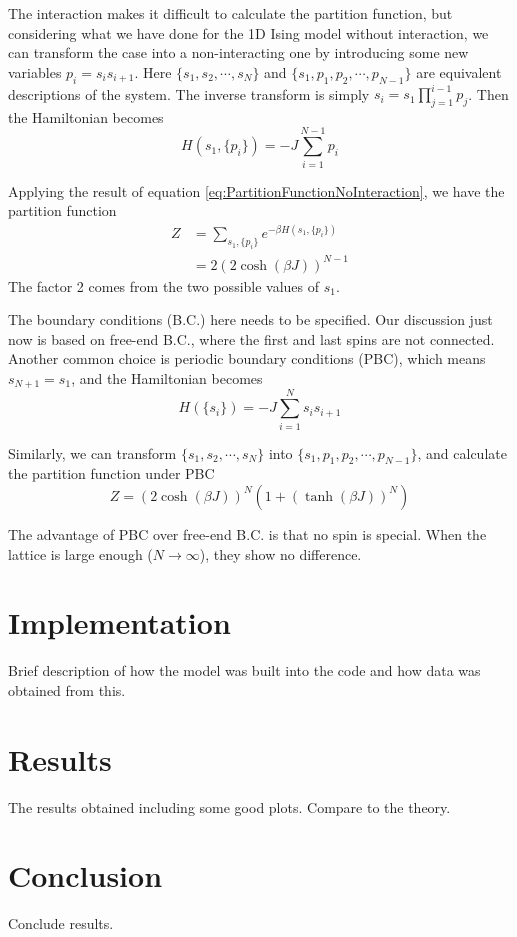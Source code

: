 \documentclass[11pt]{article}
\begin{document}
	The interaction makes it difficult to calculate the partition function, 
	but considering what we have done for the 1D Ising model without interaction, 
	we can transform the case into a non-interacting one by introducing some new variables $p_i = s_i s_{i+1}$.
	Here $\{s_1, s_2, \cdots, s_N\}$ and $\{s_1, p_1, p_2, \cdots, p_{N-1}\}$ are equivalent descriptions of the system.
	The inverse transform is simply $s_i = s_1 \prod_{j=1}^{i-1} p_j$.
	Then the Hamiltonian becomes
	\begin{equation} \label{eq:Hamiltonian1DNoFieldTransformed}
		H(s_1, \{p_i\}) = -J \sum_{i=1}^{N-1} p_i
	\end{equation}

	Applying the result of equation \eqref{eq:PartitionFunctionNoInteraction}, we have the partition function
	\begin{equation} \label{eq:PartitionFunction1DNoField}
		\begin{aligned}
			Z &= \sum_{s_1, \{p_i\}} e^{-\beta H(s_1, \{p_i\})} \\
			&= 2(2\cosh(\beta J))^{N-1}
		\end{aligned}
	\end{equation}
	The factor 2 comes from the two possible values of $s_1$.

	The boundary conditions (B.C.) here needs to be specified.
	Our discussion just now is based on free-end B.C., where the first and last spins are not connected.
	Another common choice is periodic boundary conditions (PBC), which means $s_{N+1} = s_1$, and the Hamiltonian becomes
	\begin{equation} \label{eq:Hamiltonian1DNoFieldPeriodic}
		H(\{s_i\}) = -J \sum_{i=1}^{N} s_i s_{i+1}
	\end{equation}

	Similarly, we can transform $\{s_1, s_2, \cdots, s_N\}$ into $\{s_1, p_1, p_2, \cdots, p_{N-1}\}$, 
	and calculate the partition function under PBC
	\begin{equation} \label{eq:PartitionFunction1DNoFieldPeriodic}
		Z = (2\cosh(\beta J))^N(1 + (\tanh(\beta J))^N)
	\end{equation}

	The advantage of PBC over free-end B.C. is that no spin is special.
	When the lattice is large enough ($N \to \infty$), they show no difference.

	\section{Implementation}
	
	Brief description of how the model was built into the code and how data was obtained from this.
	
	\section{Results}
	
	The results obtained including some good plots. Compare to the theory.
	
	\section{Conclusion}
	
	Conclude results.
\end{document}
